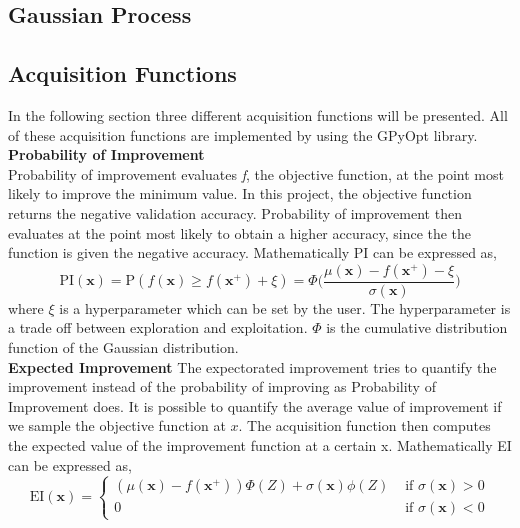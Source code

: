 \documentclass[12pt,fleqn]{article}
\begin{document}
\subsection*{Gaussian Process}


\subsection*{Acquisition Functions}
In the following section three different acquisition functions will be presented. All of these acquisition functions are implemented by using the GPyOpt library. \newline
\noindent\\
\textbf{Probability of Improvement} \\
Probability of improvement evaluates \textit{f}, the objective function, at the point most likely to improve the minimum value. In this project, the objective function returns the negative validation accuracy. Probability of improvement then evaluates at the point most likely to obtain a higher accuracy, since the the function is given the negative accuracy. Mathematically PI can be expressed as,
\begin{equation*}
	\text{PI}(\mathbf{x}) = \text{P}(f(\mathbf{x}) \geq f(\mathbf{x}^+) + \xi) 
	= \Phi\biggl(\frac{\mu(\mathbf{x}) - f(\mathbf{x}^+) - \xi}{\sigma(\mathbf{x})}\biggr)
\end{equation*}
\noindent
where $\xi$ is a hyperparameter which can be set by the user. The hyperparameter is a trade off between exploration and exploitation. $\Phi$ is the cumulative distribution function of the Gaussian distribution.
\newline \\
\textbf{Expected Improvement} \newline 
The expectorated improvement tries to quantify the improvement instead of the probability of improving as Probability of Improvement does. It is possible to quantify the average value of improvement if we sample the objective function at $ x $. The acquisition function then computes the expected value of the improvement function at a certain x. Mathematically EI can be expressed as, 
\begin{equation*}
\mathrm{EI}(\mathbf{x})=\left\{\begin{array}{ll}
\left(\mu(\mathbf{x})-f\left(\mathbf{x}^{+}\right)\right) \Phi(Z)+\sigma(\mathbf{x}) \phi(Z) & \text { if } \sigma(\mathbf{x})>0 \\
0 & \text { if } \sigma(\mathbf{x})<0
\end{array}\right. 
\end{equation*}
\end{document}
